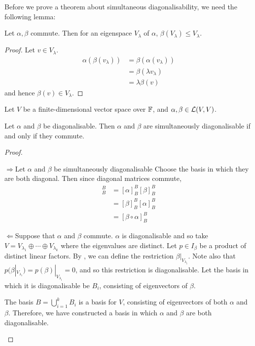 \documentclass[../Main.tex]{subfiles}
\begin{document}
Before we prove a theorem about simultaneous diagonalisability, we need the following lemma:
\begin{lemma}
    Let $\alpha, \beta$ commute. Then for an eigenspace $V_\lambda$ of $\alpha$, $\beta(V_\lambda) \leq V_\lambda$.
    \label{lemSimDiagSameEvecs}
\end{lemma}
\begin{proof}
    Let $v \in V_\lambda$.
    \begin{align*}
        \alpha(\beta(v_\lambda))&= \beta(\alpha(v_\lambda)) \\
        &= \beta(\lambda v_\lambda) \\
        &= \lambda \beta(v)
    \end{align*}
    and hence $\beta(v) \in V_\lambda$.
\end{proof}
\begin{theorem}
    Let $V$ be a finite-dimensional vector space over $\mathbb{F}$, and $\alpha, \beta \in \mathcal{L}(V, V)$.

    Let $\alpha$ and $\beta$ be diagonalisable. Then $\alpha$ and $\beta$ are simultaneously diagonalisable if and only if they commute.
    \label{thmSimDiag}
\end{theorem}
\begin{proof}
    \begin{proofdirection}{$\Rightarrow$}{Let $\alpha$ and $\beta$ be simultaneously diagonalisable}
        Choose the basis in which they are both diagonal. Then since diagonal matrices commute,
        \begin{align*}
            [\alpha \circ \beta]_B^B&= [\alpha]_B^B [\beta]_B^B \\
            &= [\beta]_B^B [\alpha]_B^B \\
            &= [\beta \circ \alpha]_B^B
        \end{align*}
    \end{proofdirection}
    \begin{proofdirection}{$\Leftarrow$}{Suppose that $\alpha$ and $\beta$ commute.}
        $\alpha$ is diagonalisable and so take $V = V_{\lambda_1} \oplus \cdots \oplus V_{\lambda_k}$ where the eigenvalues are distinct.
        Let $p \in I_\beta$ be a product of distinct linear factors. By , we can define the restriction $\beta |_{V_{\lambda_i}}$. Note also that $p(\beta |_{V_{\lambda_i}}) = p(\beta)|_{V_{\lambda_i}} = 0$, and so this restriction is diagonalisable. Let the basis in which it is diagonalisable be $B_i$, consisting of eigenvectors of $\beta$.

        The basis $B = \bigcup_{i=1}^k B_i$ is a basis for $V$, consisting of eigenvectors of both $\alpha$ and $\beta$. Therefore, we have constructed a basis in which $\alpha$ and $\beta$ are both diagonalisable.
    \end{proofdirection}
\end{proof}
\end{document}
